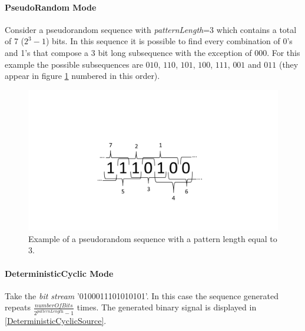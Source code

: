 \pagebreak

\paragraph*{PseudoRandom Mode}
Consider a pseudorandom sequence with \textit{patternLength}=3 which contains a total of 7 ($2^3-1$) bits. In this sequence it is possible to find every combination of 0's and 1's that compose a 3 bit long subsequence with the exception of $000$. For this example the possible subsequences are $010$, $110$, $101$, $100$, $111$, $001$ and $011$ (they appear in figure \ref{BinarySequenceN3} numbered in this order).

\begin{figure}[H]
	\centering
\includegraphics[width=\textwidth]{./lib/binary_source/figures/BinarySequenceN3.pdf}
\caption{Example of a pseudorandom sequence with a pattern length equal to 3.}\label{BinarySequenceN3}
\end{figure}

\pagebreak

\paragraph*{DeterministicCyclic Mode}

Take the \textit{bit stream} '0100011101010101'. In this case the sequence generated repeats $\frac{numberOfBits}{2^\textit{patternLength}-1}$ times. The generated binary signal is displayed in \ref{DeterministicCyclicSource}.

